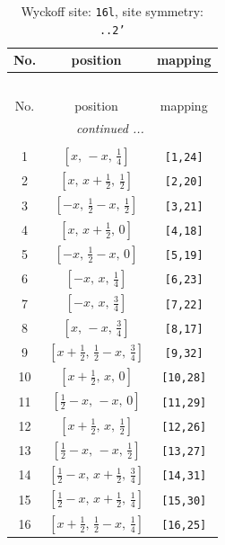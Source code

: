 \documentclass[fleqn,8pt]{jsarticle}
\begin{document}
\renewcommand{\arraystretch}{1.2}
\begin{longtable}{ccc}
\caption{Wyckoff site: {\tt 16l}, site symmetry: {\tt ..2'}}
 \\
 \hline \hline
No. & position & mapping \\ \hline \endfirsthead

\multicolumn{2}{l}{\tablename\ \thetable{}} \\
 \hline \hline
No. & position & mapping \\ \hline \endhead

 \hline \hline
\multicolumn{2}{r}{\footnotesize\it continued ...} \\ \endfoot

 \hline \hline
\multicolumn{2}{r}{} \\ \endlastfoot

1 & $\left[ x,\, - x,\, \frac{1}{4} \right]$ & {\tt [1,24]} \\ \hline
2 & $\left[ x,\, x + \frac{1}{2},\, \frac{1}{2} \right]$ & {\tt [2,20]} \\ \hline
3 & $\left[ - x,\, \frac{1}{2} - x,\, \frac{1}{2} \right]$ & {\tt [3,21]} \\ \hline
4 & $\left[ x,\, x + \frac{1}{2},\, 0 \right]$ & {\tt [4,18]} \\ \hline
5 & $\left[ - x,\, \frac{1}{2} - x,\, 0 \right]$ & {\tt [5,19]} \\ \hline
6 & $\left[ - x,\, x,\, \frac{1}{4} \right]$ & {\tt [6,23]} \\ \hline
7 & $\left[ - x,\, x,\, \frac{3}{4} \right]$ & {\tt [7,22]} \\ \hline
8 & $\left[ x,\, - x,\, \frac{3}{4} \right]$ & {\tt [8,17]} \\ \hline
9 & $\left[ x + \frac{1}{2},\, \frac{1}{2} - x,\, \frac{3}{4} \right]$ & {\tt [9,32]} \\ \hline
10 & $\left[ x + \frac{1}{2},\, x,\, 0 \right]$ & {\tt [10,28]} \\ \hline
11 & $\left[ \frac{1}{2} - x,\, - x,\, 0 \right]$ & {\tt [11,29]} \\ \hline
12 & $\left[ x + \frac{1}{2},\, x,\, \frac{1}{2} \right]$ & {\tt [12,26]} \\ \hline
13 & $\left[ \frac{1}{2} - x,\, - x,\, \frac{1}{2} \right]$ & {\tt [13,27]} \\ \hline
14 & $\left[ \frac{1}{2} - x,\, x + \frac{1}{2},\, \frac{3}{4} \right]$ & {\tt [14,31]} \\ \hline
15 & $\left[ \frac{1}{2} - x,\, x + \frac{1}{2},\, \frac{1}{4} \right]$ & {\tt [15,30]} \\ \hline
16 & $\left[ x + \frac{1}{2},\, \frac{1}{2} - x,\, \frac{1}{4} \right]$ & {\tt [16,25]} \\
\end{longtable}
\end{document}
